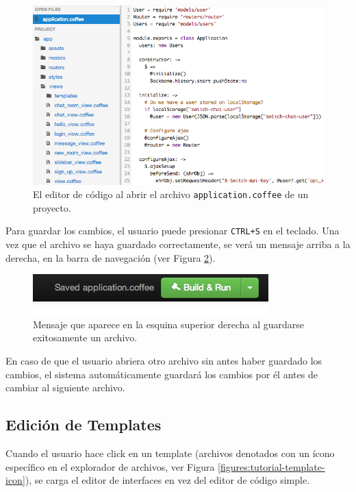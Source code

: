 \documentclass[12pt,spanish,letter]{report}
\makeatletter
\def\maxwidth{\ifdim\Gin@nat@width>\linewidth\linewidth
\else\Gin@nat@width\fi}
\let\Oldincludegraphics\includegraphics
\renewcommand{\includegraphics}[1]{\Oldincludegraphics[width=\maxwidth]{#1}}
\makeatother
\begin{document}
\begin{figure}[htbp]
\centering
\includegraphics{figures/tutorial-code.png}
\caption{El editor de código al abrir el archivo
\texttt{application.coffee} de un proyecto.
\label{figures:tutorial-code}}
\end{figure}

Para guardar los cambios, el usuario puede presionar \texttt{CTRL+S} en
el teclado. Una vez que el archivo se haya guardado correctamente, se
verá un mensaje arriba a la derecha, en la barra de navegación (ver
Figura \ref{figures:tutorial-message}).

\begin{figure}[htbp]
\centering
\includegraphics{figures/tutorial-message.png}
\caption{Mensaje que aparece en la esquina superior derecha al guardarse
exitosamente un archivo. \label{figures:tutorial-message}}
\end{figure}

En caso de que el usuario abriera otro archivo sin antes haber guardado
los cambios, el sistema automáticamente guardará los cambios por él
antes de cambiar al siguiente archivo.

\subsection{Edición de Templates}

Cuando el usuario hace click en un template (archivos denotados con un
ícono específico en el explorador de archivos, ver Figura
\ref{figures:tutorial-template-icon}), se carga el editor de interfaces
en vez del editor de código simple.
\end{document}
